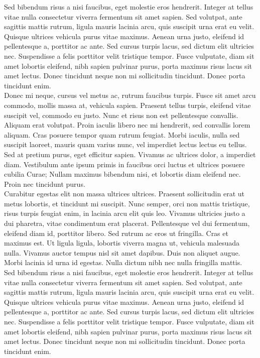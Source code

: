 Sed bibendum risus a nisi faucibus, eget molestie eros hendrerit. Integer at tellus vitae nulla consectetur viverra fermentum sit amet sapien. Sed volutpat, ante sagittis mattis rutrum, ligula mauris lacinia arcu, quis suscipit urna erat eu velit. Quisque ultrices vehicula purus vitae maximus. Aenean urna justo, eleifend id pellentesque a, porttitor ac ante. Sed cursus turpis lacus, sed dictum elit ultricies nec. Suspendisse a felis porttitor velit tristique tempor. Fusce vulputate, diam sit amet lobortis eleifend, nibh sapien pulvinar purus, porta maximus risus lacus sit amet lectus. Donec tincidunt neque non mi sollicitudin tincidunt. Donec porta tincidunt enim.
\\

Donec mi neque, cursus vel metus ac, rutrum faucibus turpis. Fusce sit amet arcu commodo, mollis massa at, vehicula sapien. Praesent tellus turpis, eleifend vitae suscipit vel, commodo eu justo. Nunc et risus non est pellentesque convallis. Aliquam erat volutpat. Proin iaculis libero nec mi hendrerit, sed convallis lorem aliquam. Cras posuere tempor quam rutrum feugiat. Morbi iaculis, nulla sed suscipit laoreet, mauris quam varius nunc, vel imperdiet lectus lectus eu tellus. Sed at pretium purus, eget efficitur sapien. Vivamus ac ultrices dolor, a imperdiet diam. Vestibulum ante ipsum primis in faucibus orci luctus et ultrices posuere cubilia Curae; Nullam maximus bibendum nisi, et lobortis diam eleifend nec. Proin nec tincidunt purus. 
\\

Curabitur egestas elit non massa ultrices ultrices. Praesent sollicitudin erat ut metus lobortis, et tincidunt mi suscipit. Nunc semper, orci non mattis tristique, risus turpis feugiat enim, in lacinia arcu elit quis leo. Vivamus ultricies justo a dui pharetra, vitae condimentum erat placerat. Pellentesque vel dui fermentum, eleifend diam id, porttitor libero. Sed rutrum ac eros ut fringilla. Cras et maximus est. Ut ligula ligula, lobortis viverra magna ut, vehicula malesuada nulla. Vivamus auctor tempus nisl sit amet dapibus. Duis non aliquet augue. Morbi lacinia id urna id egestas. Nulla dictum nibh nec nulla fringilla mattis.
\\

Sed bibendum risus a nisi faucibus, eget molestie eros hendrerit. Integer at tellus vitae nulla consectetur viverra fermentum sit amet sapien. Sed volutpat, ante sagittis mattis rutrum, ligula mauris lacinia arcu, quis suscipit urna erat eu velit. Quisque ultrices vehicula purus vitae maximus. Aenean urna justo, eleifend id pellentesque a, porttitor ac ante. Sed cursus turpis lacus, sed dictum elit ultricies nec. Suspendisse a felis porttitor velit tristique tempor. Fusce vulputate, diam sit amet lobortis eleifend, nibh sapien pulvinar purus, porta maximus risus lacus sit amet lectus. Donec tincidunt neque non mi sollicitudin tincidunt. Donec porta tincidunt enim.
\\

